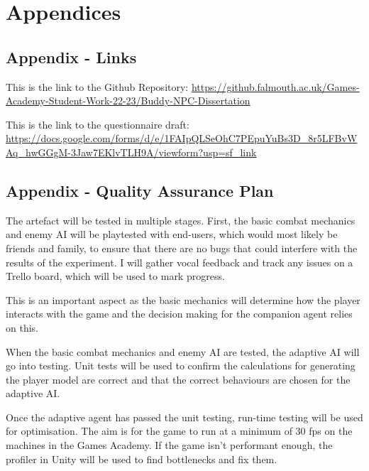 \documentclass{IEEEtran}
\begin{document}


 

\section{Appendices}
\label{Appendices}

\subsection{Appendix - Links}
\label{AppendixLinks}

This is the link to the Github Repository: \url{https://github.falmouth.ac.uk/Games-Academy-Student-Work-22-23/Buddy-NPC-Dissertation}

This is the link to the questionnaire draft: \url{https://docs.google.com/forms/d/e/1FAIpQLSeOhC7PEpuYuBs3D_8r5LFBvWAq_hwGGgM-3Jaw7EKlvTLH9A/viewform?usp=sf_link}


\subsection{Appendix - Quality Assurance Plan}
\label{AppendixQAPlan}


The artefact will be tested in multiple stages. First, the basic combat mechanics and enemy AI will be playtested with end-users, which would most likely be friends and family, to ensure that there are no bugs that could interfere with the results of the experiment. I will gather vocal feedback and track any issues on a Trello board, which will be used to mark progress.

This is an important aspect as the basic mechanics will determine how the player interacts with the game and the decision making for the companion agent relies on this.

When the basic combat mechanics and enemy AI are tested, the adaptive AI will go into testing. Unit tests will be used to confirm the calculations for generating the player model are correct and that the correct behaviours are chosen for the adaptive AI.

Once the adaptive agent has passed the unit testing, run-time testing will be used for optimisation. The aim is for the game to run at a minimum of 30 fps on the machines in the Games Academy. If the game isn't performant enough, the profiler in Unity will be used to find bottlenecks and fix them.
\end{document}
